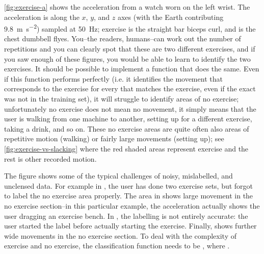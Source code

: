 \autoref{fig:exercise-a} shows the acceleration from a watch worn on the left wrist. The acceleration is along the $x$, $y$, and $z$ axes (with the Earth contributing \SI{9.8}{\meter\second^{-2}}) sampled at \SI{50}{\hertz}; exercise  is the straight bar biceps curl, and  is the chest dumbbell flyes. You--the readers, humans--can work out the number of repetitions and you can clearly spot that these are two different exercises, and if you saw enough of these figures, you would be able to learn to identify the two exercises. It should be possible to implement a function  that does the same. Even if this function performs perfectly (i.e. it identifies the movement that corresponds to the exercise for every  that matches the exercise, even if the exact  was not in the training set), it will struggle to identify areas of no exercise; unfortunately no exercise does not mean no movement, it simply means that the user is walking from one machine to another, setting up for a different exercise, taking a drink, and so on. These no exercise areas are quite often also areas of repetitive motion (walking) or fairly large movements (setting up); see \autoref{fig:exercise-vs-slacking} where the red shaded areas represent exercise and the rest is other recorded motion.


The figure shows some of the typical challenges of noisy, mislabelled, and unclensed data. For example in , the user has done two exercise sets, but forgot to label the no exercise area properly. The area in  shows large movement in the no exercise section--in this particular example, the acceleration actually shows the user dragging an exercise bench. In , the labelling is not entirely accurate: the user started the label before actually starting the exercise. Finally,  shows further wide movements in the no exercise section. To deal with the complexity of exercise and no exercise, the classification function needs to be , where . 

